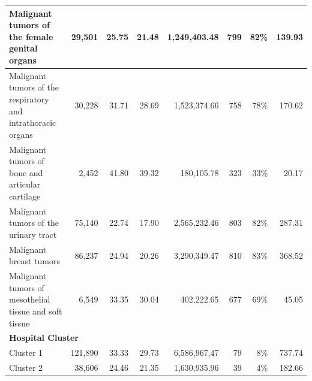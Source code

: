 \begin{table}[h]
{\begin{tabular}{|l|r|r|r|r|r|r|r|}
            Malignant tumors of the female genital organs                                    & 29,501           & 25.75                    & 21.48                    & 1,249,403.48            & 799                  & 82\%                  & 139.93                      \\ \hline
            Malignant tumors of the respiratory and intrathoracic organs                     & 30,228           & 31.71                    & 28.69                    & 1,523,374.66            & 758                  & 78\%                  & 170.62                      \\ \hline
            Malignant tumors of bone and articular cartilage                                 & 2,452            & 41.80                    & 39.32                    & 180,105.78              & 323                  & 33\%                  & 20.17                       \\ \hline
            Malignant tumors of the urinary tract                                            & 75,140           & 22.74                    & 17.90                    & 2,565,232.46            & 803                  & 82\%                  & 287.31                      \\ \hline
            Malignant breast tumors                                                          & 86,237           & 24.94                    & 20.26                    & 3,290,349.47            & 810                  & 83\%                  & 368.52                      \\ \hline
            Malignant tumors of mesothelial tissue and soft tissue                           & 6,549            & 33.35                    & 30.04                    & 402,222.65              & 677                  & 69\%                  & 45.05                       \\ \hline
            \multicolumn{8}{|l|}{\textbf{Hospital Cluster}}                                                                                                                                                                                                                  \\ \hline
            Cluster 1                                                                        & 121,890          & 33.33                    & 29.73                    & 6,586,967,47            & 79                   & 8\%                   & 737.74                      \\ \hline
            Cluster 2                                                                        & 38,606           & 24.46                    & 21.35                    & 1,630,935,96            & 39                   & 4\%                   & 182.66                      \\ \hline

\end{tabular}}
\end{table}
